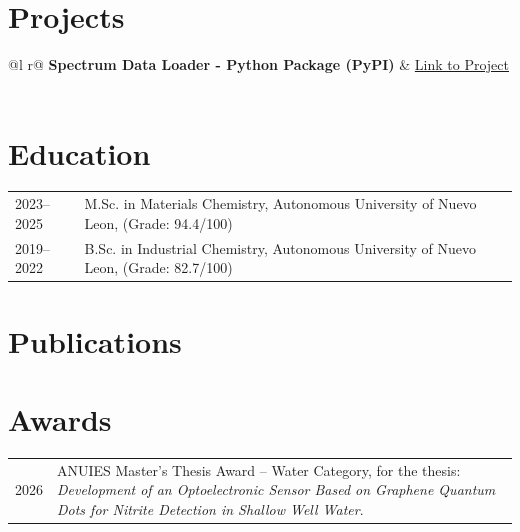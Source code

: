 \documentclass[a4paper,12pt]{article}
\begin{document}
\section{Projects}

\begin{tabularx}{\linewidth}{ @{}l r@{} }
\textbf{Spectrum Data Loader - Python Package (PyPI)} & \hfill \href{https://pypi.org/project/spectrum-data-loader/0.1.0/}{Link to Project} \\[3.75pt]
  \\
\end{tabularx}
  
\section{Education}
\begin{tabularx}{\textwidth}{@{}l X@{} }
2023--2025 & M.Sc. in Materials Chemistry, Autonomous University of Nuevo Leon, (Grade: 94.4/100) \\
2019--2022 & B.Sc. in Industrial Chemistry, Autonomous University of Nuevo Leon, (Grade: 82.7/100) \\
\end{tabularx}


\section{Publications}
\begin{refsection}
\nocite{*}
\printbibliography[heading=none]
\end{refsection}

\section{Awards}
\begin{tabularx}{\linewidth}{@{}l X@{}}
2026 & ANUIES Master's Thesis Award -- Water Category, for the thesis: \textit{Development of an Optoelectronic Sensor Based on Graphene Quantum Dots for Nitrite Detection in Shallow Well Water}. \\
\end{tabularx}
\end{document}
